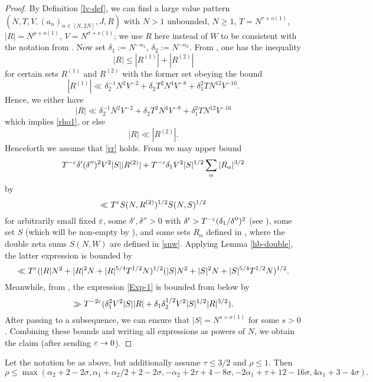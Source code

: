 \begin{proof}  By Definition \ref{lv-def}, we can find a large value pattern $(N,T,V,(a_n)_{n \in [N,2N]},J,R)$ with $N>1$ unbounded, $N \geq 1$, $T = N^{\tau+o(1)}$, $|R| = N^{\rho+o(1)}$, $V = N^{\sigma+o(1)}$; we use $R$ here instead of $W$ to be consistent with the notation from \cite{bourgain_large_2000}.  Now set $\delta_1 := N^{-\alpha_1}$, $\delta_2 := N^{-\alpha_2}$.  From \cite[(4.41), (4.42)]{bourgain_large_2000}, one has the inequality
    $$ |R| \leq |R^{(1)}| + |R^{(2)}|$$
    for certain sets $R^{(1)}$ and $R^{(2)}$ with the former set obeying the bound
$$ |R^{(1)}| \ll \delta_2^{-1} N^2 V^{-2} + \delta_2 T^2 N^4 V^{-8} + \delta_1^2 T N^{12} V^{-16}.$$
Hence, we either have
$$ |R| \ll \delta_2^{-1} N^2 V^{-2} + \delta_2 T^2 N^4 V^{-8} + \delta_1^2 T N^{12} V^{-16}$$
which implies \eqref{rho1}, or else
\begin{equation}\label{rr}
    |R| \ll |R^{(2)}|.
\end{equation}
Henceforth we assume that \eqref{rr} holds. From \cite[(4.53), (4.54)]{bourgain_large_2000} we may upper bound
\begin{equation}\label{Exp-1}
     T^{-\varepsilon} \delta' (\delta'')^2 V^2 |S| |R^{(2)}| + T^{-\varepsilon} \delta_1 V^2 |S|^{1/2} \sum_\alpha |R_\alpha|^{3/2}
\end{equation}
by
\begin{equation}\label{Exp-2}
    \ll T^\varepsilon S(N,R^{(2)})^{1/2} S(N,S)^{1/2}
\end{equation}
for arbitrarily small fixed $\varepsilon$, some $\delta',\delta''>0$ with $\delta' > T^{-\varepsilon} (\delta_1/\delta'')^2$ (see \cite[(4.37)]{bourgain_large_2000}), some set $S$ (which will be non-empty by \cite[(4.47)]{bourgain_large_2000}), and some sets $R_\alpha$ defined in \cite[(4.39)]{bourgain_2000}, where the double zeta sums $S(N,W)$ are defined in \eqref{snw}.  Applying Lemma \ref{hb-double}, the latter expression is bounded by
$$ \ll T^\varepsilon (|R|N^2 + |R|^2 N + |R|^{5/4} T^{1/2} N)^{1/2} (|S| N^2 + |S|^2 N + |S|^{5/4} T^{1/2} N)^{1/2}.$$
Meanwhile, from \cite[(4.57)]{bourgain_large_2000}, the expression \eqref{Exp-1} is bounded from below by
$$ \gg T^{-2\varepsilon} (\delta_1^2 V^2 |S| |R| + \delta_1 \delta_2^{1/2} V^2 |S|^{1/2} |R|^{3/2}).$$
After passing to a subsequence, we can ensure that $|S| = N^{s+o(1)}$ for some $s > 0$.
Combining these bounds and writing all expressions as powers of $N$, we obtain the claim (after sending $\varepsilon \to 0$).
\end{proof}

\begin{corollary}\label{borg-lv-simp} \cite[Lemma 4.60]{bourgain_large_2000} Let the notation be as above, but additionally assume $\tau \leq 3/2$ and $\rho \leq 1$.  Then
$$ \rho \leq \max( \alpha_2 + 2 - 2 \sigma, \alpha_1+\alpha_2/2 + 2-2\sigma, -\alpha_2 + 2\tau+4-8\sigma, -2\alpha_1 + \tau + 12 - 16 \sigma, 4\alpha_1 + 3-4\sigma).$$
\end{corollary}

